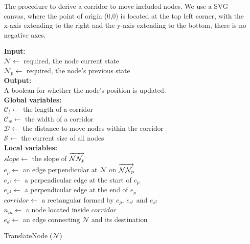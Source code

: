 \begin{algorithm}[tb!]
    \caption{The procedure to derive a corridor to move included nodes. We use a SVG canvas, where the point of origin (0,0) is located at the top left corner, with the x-axis extending to the right and the y-axis extending to the bottom, there is no negative axes.}\label{alg:derive corridor}

    \textbf{Input:} \\
    $ \mathcal{N} \gets $ required, the node current state \\
    $ \mathcal{N}_{p} \gets $ required, the node's previous state \\

    \textbf{Output:} \\
    A boolean for whether the node's position is updated. \\

    \textbf{Global variables:} \\
    $ \mathcal{C}_l \gets $ the length of a corridor \\
    $ \mathcal{C}_w \gets $ the width of a corridor \\
    $ \mathcal{D} \gets $ the distance to move nodes within the corridor \\
    $ \mathcal{S} \gets $ the current size of all nodes \\

    \textbf{Local variables:} \\
    $ slope \gets $ the slope of $ \overrightarrow{\mathcal{N}\mathcal{N}_{p}\strut} $ \\
    $ e_{p} \gets $ an edge perpendicular at $ \mathcal{N} $ on $ \overrightarrow{\mathcal{N}\mathcal{N}_{p}\strut} $ \\
    $ e_{s^1} \gets $ a perpendicular edge at the start of $ e_{p} $ \\
    $ e_{s^2} \gets $ a perpendicular edge at the end of $ e_{p} $ \\
    $ corridor \gets $ a rectangular formed by $ e_p $, $ e_{s^1} $ and $ e_{s^2} $ \\
    $ n_{in} \gets $ a node located inside $ corridor $ \\
    $ e_{d} \gets $ an edge connecting $ \mathcal{N} $ and its destination \\

    \begin{algorithmic}[1]
            \State TranslateNode ($ \mathcal{N} $)


\end{algorithmic}
\end{algorithm}
